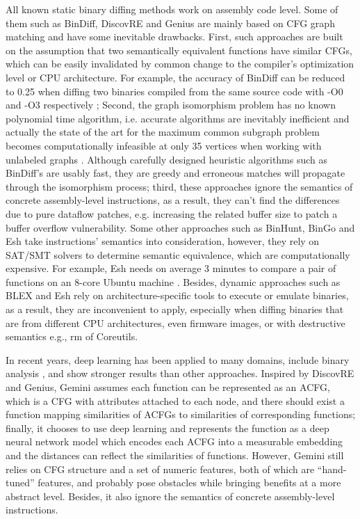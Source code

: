 \documentclass[10pt,conference]{IEEEtran}
\begin{document}
All known static binary diffing methods work on assembly code level. 
Some of them such as BinDiff, DiscovRE and Genius are mainly based on CFG graph matching and have some inevitable drawbacks. 
First, such approaches are built on the assumption that two semantically equivalent functions have similar CFGs, which can be easily invalidated 
by common change to the compiler’s optimization level or CPU architecture. 
For example, the accuracy of BinDiff can be reduced to 0.25 when diffing two binaries compiled from the same source code with -O0 and -O3 
respectively \cite{egele2014blanket}; 
Second, the graph isomorphism problem has no known polynomial time algorithm, i.e. accurate algorithms are inevitably inefficient and 
actually the state of the art for the maximum common subgraph problem becomes computationally infeasible at only 35 vertices when 
working with unlabeled graphs \cite{hoffmann2017between}.
Although carefully designed heuristic algorithms such as BinDiff’s are usably fast, they are greedy and erroneous matches will 
propagate through the isomorphism process; 
third, these approaches ignore the semantics of concrete assembly-level instructions, as a result, they can’t find the differences 
due to pure dataflow patches, e.g. increasing the related buffer size to patch a buffer overflow vulnerability. 
Some other approaches such as BinHunt, BinGo and Esh take instructions’ semantics into consideration, however, they rely on SAT/SMT 
solvers to determine semantic equivalence, which are computationally expensive. 
For example, Esh needs on average 3 minutes to compare a pair of functions on an 8-core Ubuntu machine \cite{david2016statistical}. 
Besides, dynamic approaches such as BLEX and Esh rely on architecture-speciﬁc tools to execute or emulate binaries, as a result, 
they are inconvenient to apply, especially when diffing binaries that are from different CPU architectures, even firmware images, 
or with destructive semantics e.g., rm of Coreutils.

In recent years, deep learning \cite{lecun2015deep} has been applied to many domains, include binary analysis \cite{shin2015recognizing}, 
and show stronger results than other approaches. 
Inspired by DiscovRE and Genius, Gemini \cite{xu2017neural} assumes each function can be represented as an ACFG, which is a CFG with attributes 
attached to each node, and there should exist a function mapping similarities of ACFGs to similarities of corresponding functions; 
finally, it chooses to use deep learning and represents the function as a deep neural network model which encodes each ACFG into a 
measurable embedding and the distances can reflect the similarities of functions.
However, Gemini still relies on CFG structure and a set of numeric features, both of which are “hand-tuned” features, and probably 
pose obstacles while bringing benefits at a more abstract level. Besides, it also ignore the semantics of concrete assembly-level instructions.
\end{document}
